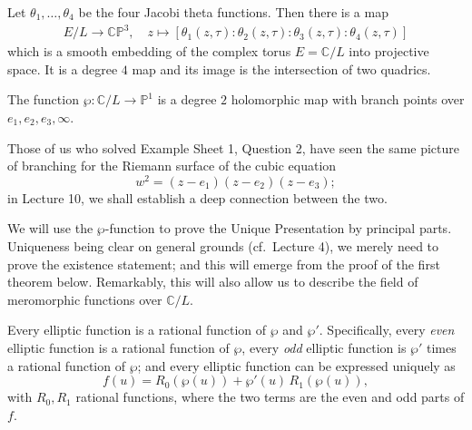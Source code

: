 \documentclass[12pt]{article}
\begin{document}
\begin{theorem}
    Let $\theta_1,\dots,\theta_4$ be the four Jacobi theta functions. Then there is a map \begin{align*}
        E/L \to \mathbb{CP}^3, \quad z \mapsto [\theta_1(z,\tau):\theta_2(z,\tau):\theta_3(z,\tau):\theta_4(z,\tau)]
    \end{align*} which is a smooth embedding of the complex torus $E=\mathbb{C}/L$ into projective space. It is a degree $4$ map and its image is the intersection of two quadrics.
\end{theorem}

\begin{proposition}
The function $\wp : \mathbb{C}/L \to \mathbb{P}^1$ is a degree $2$ holomorphic map with branch points over 
$e_1, e_2, e_3, \infty$.
\end{proposition}

Those of us who solved Example Sheet 1, Question 2, have seen the same picture of branching 
for the Riemann surface of the cubic equation
\[
    w^2 = (z - e_1)(z - e_2)(z - e_3);
\]
in Lecture 10, we shall establish a deep connection between the two.

We will use the $\wp$-function to prove the Unique Presentation by principal parts.
Uniqueness being clear on general grounds (cf.\ Lecture 4), we merely need to prove the existence statement;
and this will emerge from the proof of the first theorem below. 
Remarkably, this will also allow us to describe the field of meromorphic functions over $\mathbb{C}/L$.

\begin{theorem}
Every elliptic function is a rational function of $\wp$ and $\wp'$. 
Specifically, every \emph{even} elliptic function is a rational function of $\wp$, 
every \emph{odd} elliptic function is $\wp'$ times a rational function of $\wp$;
and every elliptic function can be expressed uniquely as
\[
    f(u) = R_0(\wp(u)) + \wp'(u)\, R_1(\wp(u)),
\]
with $R_0, R_1$ rational functions, where the two terms are the even and odd parts of $f$.
\end{theorem}
\end{document}
